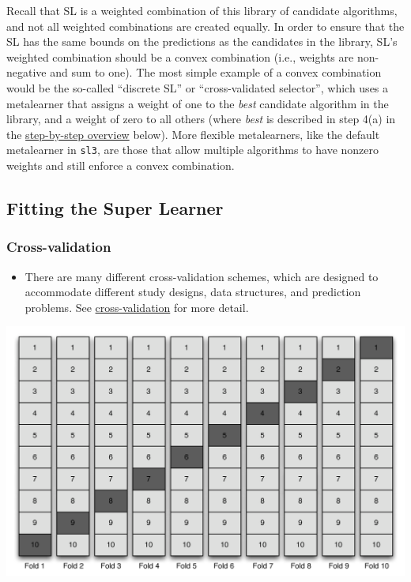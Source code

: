 \documentclass[
  12pt, krantz2,
]{krantz}
\newcommand{\passthrough}[1]{#1}
\providecommand{\tightlist}{%
  \setlength{\itemsep}{0pt}\setlength{\parskip}{0pt}}
\theoremstyle{definition}
\theoremstyle{definition}
\theoremstyle{definition}
\newcommand{\1}{\mathbbm{1}}
\begin{document}
Recall that SL is a weighted combination of this library of candidate
algorithms, and not all weighted combinations are created equally. In order to
ensure that the SL has the same bounds on the predictions as the candidates in
the library, SL's weighted combination should be a convex combination
(i.e., weights are non-negative and sum to one). The most simple example of a
convex combination would be the so-called ``discrete SL'' or
``cross-validated selector'', which uses a metalearner that assigns a weight of
one to the \emph{best} candidate algorithm in the library, and a weight of zero to
all others (where \emph{best} is described in step 4(a) in the \protect\hyperlink{sl3-theory}{step-by-step
overview} below). More flexible metalearners,
like the default metalearner in \passthrough{\lstinline!sl3!}, are those that allow multiple algorithms
to have nonzero weights and still enforce a convex combination.

\hypertarget{sl3-steps}{%
\subsection{Fitting the Super Learner}\label{sl3-steps}}

\hypertarget{cross-validation}{%
\subsubsection{Cross-validation}\label{cross-validation}}

\begin{itemize}
\tightlist
\item
  There are many different cross-validation schemes, which are designed to
  accommodate different study designs, data structures, and prediction
  problems. See \protect\hyperlink{causal}{cross-validation} for more detail.
\end{itemize}

\begin{center}\includegraphics[width=0.8\linewidth]{img/png/vs} \end{center}
\end{document}
